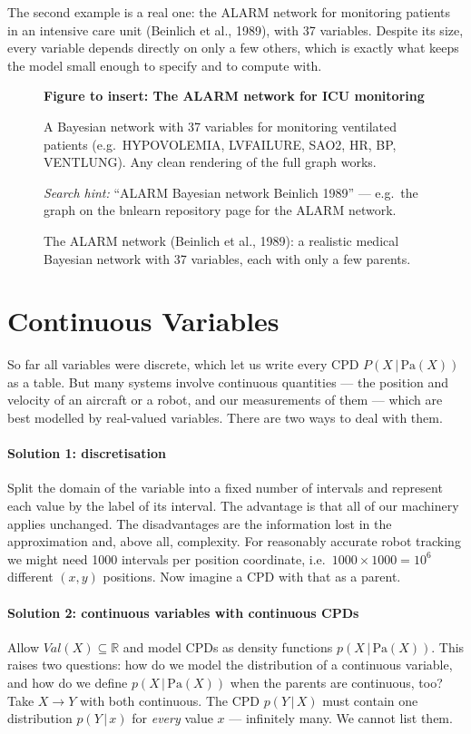 \documentclass[11pt, oneside]{book}
\newcommand{\R}{\mathbb{R}}
\newcommand{\Prob}{\mathbb{P}}           %
\newcommand{\given}{\,\vert\,}           %
\newcommand{\Val}{\mathit{Val}}          %
\newcommand{\Pa}{\mathrm{Pa}}            %
\newcommand{\figureplaceholder}[5]{%
\begin{figure}[htbp]
\centering
\begin{tcolorbox}[unbreakable,width=\linewidth,height=#1,colback=accent!3,
  colframe=accent!30,boxrule=0.5pt,arc=2.5mm,sharp corners=all,
  valign=center,halign=center,fontupper=\small]
{\bfseries\color{accent}Figure to insert: #2}\par\medskip
{\color{gray!75!black}#3}
\end{tcolorbox}
\caption{#4}\label{#5}
\end{figure}}
\let\originalsection\section
\renewcommand{\section}{\Needspace{7\baselineskip}\originalsection}
\begin{document}
The second example is a real one: the ALARM network for monitoring patients
in an intensive care unit (Beinlich et al., 1989), with 37 variables. Despite
its size, every variable depends directly on only a few others, which is
exactly what keeps the model small enough to specify and to compute with.

\figureplaceholder{5.5cm}{The ALARM network for ICU monitoring}{A Bayesian
network with 37 variables for monitoring ventilated patients
(e.g.\ HYPOVOLEMIA, LVFAILURE, SAO2, HR, BP, VENTLUNG). Any clean rendering of
the full graph works.\par\smallskip
\textit{Search hint:} ``ALARM Bayesian network Beinlich 1989'' --- e.g.\ the
graph on the bnlearn repository page for the ALARM network.}{The ALARM network
(Beinlich et al., 1989): a realistic medical Bayesian network with 37
variables, each with only a few parents.}{fig:alarm}

\section{Continuous Variables}
\label{sec:bn-continuous}

So far all variables were discrete, which let us write every CPD
$P(X \given \Pa(X))$ as a table. But many systems involve continuous
quantities --- the position and velocity of an aircraft or a robot, and our
measurements of them --- which are best modelled by real-valued variables.
There are two ways to deal with them.

\paragraph{Solution 1: discretisation} Split the domain of the variable into a
fixed number of intervals and represent each value by the label of its
interval. The advantage is that all of our machinery applies unchanged. The
disadvantages are the information lost in the approximation and, above all,
complexity. For reasonably accurate robot tracking we might need 1000
intervals per position coordinate, i.e.\ $1000 \times 1000 = 10^6$ different
$(x, y)$ positions. Now imagine a CPD with that as a parent.

\paragraph{Solution 2: continuous variables with continuous CPDs} Allow
$\Val(X) \subseteq \R$ and model CPDs as density functions $p(X \given
\Pa(X))$. This raises two questions: how do we model the distribution of a
continuous variable, and how do we define $p(X \given \Pa(X))$ when the
parents are continuous, too? Take $X \to Y$ with both continuous. The CPD
$p(Y \given X)$ must contain one distribution $p(Y \given x)$ for
\emph{every} value $x$ --- infinitely many. We cannot list them.
\end{document}
